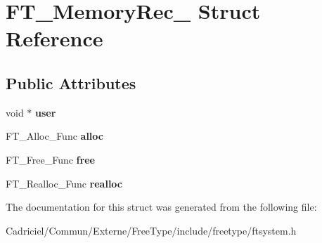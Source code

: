 \hypertarget{struct_f_t___memory_rec__}{\section{F\-T\-\_\-\-Memory\-Rec\-\_\- Struct Reference}
\label{struct_f_t___memory_rec__}
}
\subsection*{Public Attributes}
\begin{DoxyCompactItemize}
\item 
\hypertarget{struct_f_t___memory_rec___aae5bc614434ba4525e37d7faaf03c4b7}{void $\ast$ {\bfseries user}}\label{struct_f_t___memory_rec___aae5bc614434ba4525e37d7faaf03c4b7}

\item 
\hypertarget{struct_f_t___memory_rec___a2269eada6afbb008fe5c73707145410c}{F\-T\-\_\-\-Alloc\-\_\-\-Func {\bfseries alloc}}\label{struct_f_t___memory_rec___a2269eada6afbb008fe5c73707145410c}

\item 
\hypertarget{struct_f_t___memory_rec___a83ab2422bd9265d8731b9e5e368ba240}{F\-T\-\_\-\-Free\-\_\-\-Func {\bfseries free}}\label{struct_f_t___memory_rec___a83ab2422bd9265d8731b9e5e368ba240}

\item 
\hypertarget{struct_f_t___memory_rec___a5ce3424cc72e898fe973ffeabe44a95c}{F\-T\-\_\-\-Realloc\-\_\-\-Func {\bfseries realloc}}\label{struct_f_t___memory_rec___a5ce3424cc72e898fe973ffeabe44a95c}

\end{DoxyCompactItemize}


The documentation for this struct was generated from the following file\-:\begin{DoxyCompactItemize}
\item 
Cadriciel/\-Commun/\-Externe/\-Free\-Type/include/freetype/ftsystem.\-h\end{DoxyCompactItemize}
